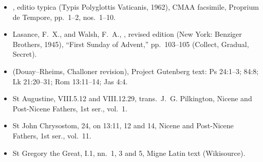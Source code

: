 {\footnotesize
\begin{itemize}\setlength{\itemsep}{0.15em}\setlength{\parskip}{0pt}
\item {}, editio typica (Typis Polyglottis Vaticanis, 1962), CMAA facsimile, Proprium de Tempore, pp.~1--2, nos.~1--10.
\item Lasance, F.~X., and Walsh, F.~A., , revised edition (New York: Benziger Brothers, 1945), ``First Sunday of Advent,'' pp.~103--105 (Collect, Gradual, Secret).
\item {} (Douay--Rheims, Challoner revision), Project Gutenberg text: Ps 24:1--3; 84:8; Lk 21:20--31; Rom 13:11--14; Jas 4:4.
\item St Augustine,  VIII.5.12 and VIII.12.29, trans.\ J.~G. Pilkington, Nicene and Post-Nicene Fathers, 1st ser., vol.~1.
\item St John Chrysostom,  24, on 13:11, 12 and 14, Nicene and Post-Nicene Fathers, 1st ser., vol.~11.
\item St Gregory the Great,  I.1, nn.~1, 3 and 5, Migne Latin text (Wikisource).
\end{itemize}
\par}
